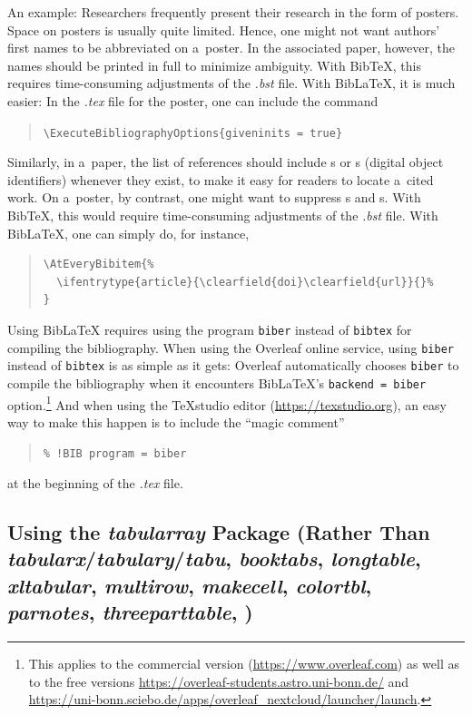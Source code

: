 An example: Researchers frequently present their research in the form of posters. Space on posters is usually quite limited. Hence, one might not want authors' first names to be abbreviated on a~poster. In the associated paper, however, the names should be printed in full to minimize ambiguity. With BibTeX, this requires time-consuming adjustments of the \textit{.bst} file. With BibLaTeX, it is much easier: In the \textit{.tex} file for the poster, one can include the command
\begin{quote}
	\verb|\ExecuteBibliographyOptions{giveninits = true}|
\end{quote}

Similarly, in a~paper, the list of references should include s or s (digital object identifiers) whenever they exist, to make it easy for readers to locate a~cited work. On a~poster, by contrast, one might want to suppress s and s. With BibTeX, this would require time-consuming adjustments of the \textit{.bst} file. With BibLaTeX, one can simply do, for instance,
\begin{quote}
\begin{verbatim}
\AtEveryBibitem{%
  \ifentrytype{article}{\clearfield{doi}\clearfield{url}}{}%
}
\end{verbatim}
\end{quote}

Using BibLaTeX requires using the program \verb|biber| instead of \verb|bibtex| for compiling the bibliography. When using the Overleaf online service, using \verb|biber| instead of \verb|bibtex| is as simple as it gets: Overleaf automatically chooses \verb|biber| to compile the bibliography when it encounters BibLaTeX's \verb|backend = biber| option.\footnote{This applies to the commercial version (\url{https://www.overleaf.com}) as well as to the free versions \url{https://overleaf-students.astro.uni-bonn.de/} and \url{https://uni-bonn.sciebo.de/apps/overleaf_nextcloud/launcher/launch}.} And when using the TeXstudio editor (\url{https://texstudio.org}), an easy way to make this happen is to include the ``magic comment''
\begin{quote}
	\verb|% !BIB program = biber|
\end{quote}
at the beginning of the \textit{.tex} file.

\subsection{Using the \mbox{\textit{tabularray}} Package (Rather Than \mbox{\textit{tabularx}}\slash \mbox{\textit{tabulary}}\slash \mbox{\textit{tabu}}, \mbox{\textit{booktabs}}, \mbox{\textit{longtable}}, \mbox{\textit{xltabular}}, \mbox{\textit{multirow}}, \mbox{\textit{makecell}}, \mbox{\textit{colortbl}}, \mbox{\textit{parnotes}}, \mbox{\textit{threeparttable}}, \textellipsis)}

